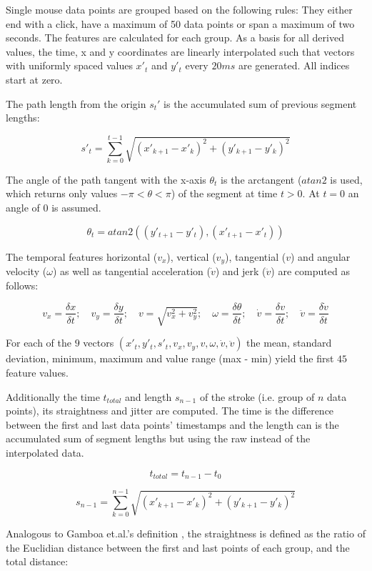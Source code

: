 \documentclass[
    fontsize=12pt,
    headings=small,
    parskip=half,           %
    bibliography=totoc,
    numbers=noenddot,       %
    open=any,               %
    final,                   %
    table
]{scrreprt}
\begin{document}
Single mouse data points are grouped based on the following rules: They either end with a click, have a maximum of 50 data points or span a maximum of two seconds. The features are calculated for each group. As a basis for all derived values, the time, x and y coordinates are linearly interpolated such that vectors with uniformly spaced values $x'_t$ and $y'_t$ every $20ms$ are generated. All indices start at zero.

The path length from the origin $s_t'$ is the accumulated sum of previous segment lengths:

\[
s'_t = \sum_{k = 0}^{t - 1} \sqrt{(x'_{k+1} - x'_{k})^2 + (y'_{k+1} - y'_{k})^2}
\]

The angle of the path tangent with the x-axis $\theta_t$ is the arctangent ($atan2$ is used, which returns only values $-\pi < \theta < \pi$) of the segment at time $t > 0$. At $t=0$ an angle of $0$ is assumed.

\[
\theta_t = atan2( (y'_{t+1} - y'_{t}), (x'_{t+1} - x'_{t}) )
\]

The temporal features horizontal ($v_x$), vertical ($v_y$), tangential ($v$) and angular velocity ($\omega$) as well as tangential acceleration ($\dot{v}$) and jerk ($\ddot{v}$) are computed as follows:

\[
v_x = \frac{\delta x}{\delta t}; \quad
v_y = \frac{\delta y}{\delta t}; \quad
v = \sqrt{v_x^2 + v_y^2}; \quad
\omega = \frac{\delta \theta}{\delta t}; \quad
\dot{v} = \frac{\delta v}{\delta t}; \quad
\ddot{v} = \frac{\delta \dot{v}}{\delta t}
\]

For each of the $9$ vectors $(x'_t, y'_t, s'_t, v_x, v_y, v, \omega, \dot{v}, \ddot{v})$ the mean, standard deviation, minimum, maximum and value range (max - min) yield the first $45$ feature values.

Additionally the time $t_{total}$ and length $s_{n-1}$ of the stroke (i.e. group of $n$ data points), its straightness and jitter are computed. The time is the difference between the first and last data points' timestamps and the length can is the accumulated sum of segment lengths but using the raw instead of the interpolated data.

\[
t_{total} = t_{n-1} - t_0
\]

\[
s_{n-1} = \sum_{k = 0}^{n - 1} \sqrt{(x'_{k+1} - x'_{k})^2 + (y'_{k+1} - y'_{k})^2}
\]

Analogous to Gamboa et.al.'s definition \cite{GAMBOA2004}, the straightness is defined as the ratio of the Euclidian distance between the first and last points of each group, and the total distance:
\end{document}
